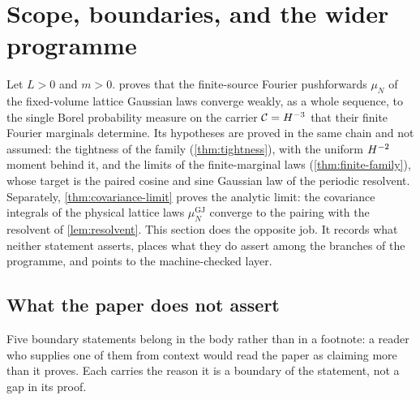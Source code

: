 %
%
%
\section{Scope, boundaries, and the wider programme}\label{sec:scope}

Let $L>0$ and $m>0$.   proves that the finite-source Fourier
pushforwards $\mu_N$ of the fixed-volume lattice Gaussian laws converge weakly, as
a whole sequence, to the single Borel probability measure on the carrier
$\mathcal C=H^{-3}$ that their finite Fourier marginals determine. Its hypotheses
are proved in the same chain and not assumed: the tightness of the family
(\cref{thm:tightness}), with the uniform $H^{-2}$ moment behind it, and the limits
of the finite-marginal laws (\cref{thm:finite-family}), whose target is the paired
cosine and sine Gaussian law of the periodic resolvent.  Separately,
\cref{thm:covariance-limit} proves the analytic limit: the covariance integrals of
the physical lattice laws $\mu^{\mathrm{GJ}}_N$ converge to the pairing with the
resolvent of \cref{lem:resolvent}.  This section does the
opposite job.  It records what neither statement asserts, places what they do
assert among the branches of the programme, and points to the machine-checked
layer.

\subsection{What the paper does not assert}

Five boundary statements belong in the body rather than in a footnote: a reader who
supplies one of them from context would read the paper as claiming more than it
proves.  Each carries the reason it is a boundary of the statement, not a gap in
its proof.

